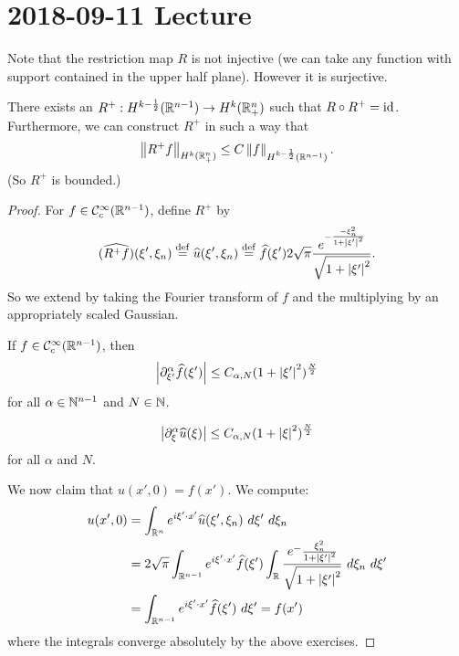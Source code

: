 \section{2018-09-11 Lecture}

Note that the restriction map $R$ is not injective (we can take any function with support contained in the upper half plane).
However it is surjective.

\begin{prop}
  There exists an $R^+: H^{k-\frac12}(\mathbb{R}^{n-1}) \to H^k(\mathbb{R}^n_+)$ such that $R \circ R^+ = \operatorname{id}$.
  Furthermore, we can construct $R^+$ in such a way that
  \[ \left\lVert R^+f \right\rVert_{H^k(\mathbb{R}_+^n)} \leq C\left\lVert f \right\rVert_{H^{k-\frac12}(\mathbb{R}^{n-1})}. \]
  (So $R^+$ is bounded.)
\end{prop}

\begin{proof}
  For $f\in\mathcal{C}_c^\infty(\mathbb{R}^{n-1})$, define $R^+$ by
  \[ (\widehat{R^+f})(\xi',\xi_n) \overset{\mathrm{def}}{=} \widehat u(\xi',\xi_n) \overset{\mathrm{def}}{=} \widehat f(\xi') 2\sqrt\pi \frac{e^{-\frac{-\xi_n^2}{1+\left\lvert \xi' \right\rvert^2}}}{\sqrt{1+\left\lvert \xi' \right\rvert^2}}. \]
  So we extend by taking the Fourier transform of $f$ and the multiplying by an appropriately scaled Gaussian.

  \begin{exer}
    If $f\in\mathcal{C}_c^\infty(\mathbb{R}^{n-1})$, then
    \[ \left\lvert \partial_{\xi'}^\alpha \widehat f(\xi') \right\rvert \leq C_{\alpha,N} (1+\left\lvert \xi' \right\rvert^2)^\frac N2 \]
    for all $\alpha\in\mathbb{N}^{n-1}$ and $N\in\mathbb{N}$.
  \end{exer}

  \begin{exer}
    \[ \left\lvert \partial_\xi^\alpha \widehat u(\xi) \right\rvert \leq C_{\alpha,N} (1+\left\lvert \xi \right\rvert^2)^\frac N2 \]
    for all $\alpha$ and $N$.
  \end{exer}

  We now claim that $u(x',0)=f(x')$.
  We compute:
  \begin{align*}
    u(x',0) &= \int_{\RR^n} e^{i\xi'\cdot x'} \wh u(\xi',\xi_n) \ d\xi' \ d\xi_n \\
    &= 2\sqrt\pi \int_{\RR^{n-1}} e^{i\xi'\cdot x'} \wh f(\xi') \int_\RR \frac{e^-\frac{\xi_n^2}{1+\abs{\xi'}^2}}{\sqrt{1+\abs{\xi'}^2}} \ d\xi_n \ d\xi' \\
    &= \int_{\RR^{n-1}} e^{i\xi'\cdot x'} \wh f(\xi') \ d\xi' = f(x')
  \end{align*}
  where the integrals converge absolutely by the above exercises.


\end{proof}

